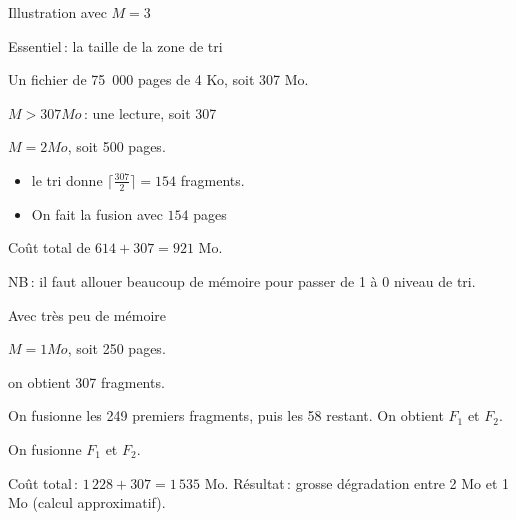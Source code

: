 \begin{frame}{Illustration avec $M = 3$}


\end{frame}
\begin{frame}{Essentiel\,: la taille de la zone de tri}

Un fichier de 75~000 pages de 4 Ko, soit 307 Mo.
\begin{redbullet}
  \item \textbf{$M > 307 Mo$}\,: une lecture, soit 307 

  \item \textbf{$M = 2 Mo$}, soit 500 pages.
    \begin{itemize}
      \item le tri donne $\lceil \frac{307}{2} \rceil = 154$
        fragments.

      \item On fait la fusion avec $154$ pages
     \end{itemize}
       Coût total de $614 + 307 = 921$ Mo. 
\end{redbullet}

NB\,: il faut allouer beaucoup de mémoire pour
passer de 1 à 0 niveau de tri.

\end{frame}


\begin{frame}{Avec très peu de mémoire}

\textbf{$M = 1 Mo$}, soit 250 pages.

\vfill

    \begin{redbullet}
       \item on obtient 307 fragments.

       \item On fusionne les 249 premiers fragments,
               puis les 58 restant. On obtient $F_1$ et $F_2$.
        \item On fusionne $F_1$ et $F_2$.
   \end{redbullet}

\vfill

 Coût total\,: $1\,228 + 307 = 1\,535$ Mo.
\vfill
Résultat\,: grosse dégradation entre 2 Mo et 1 Mo (calcul
approximatif).



\end{frame}


